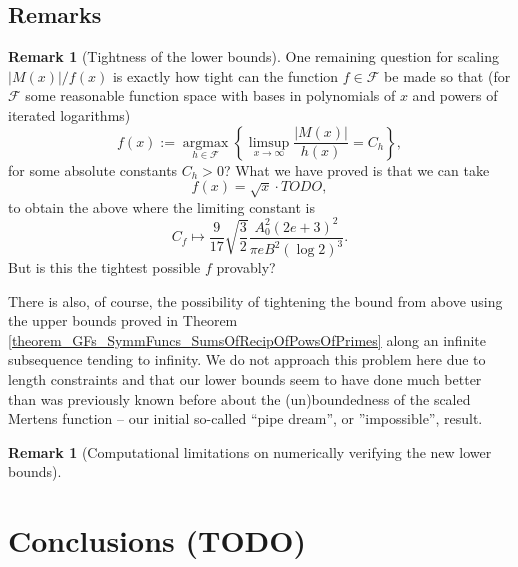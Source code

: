 \documentclass[11pt,reqno,a4letter]{article}
\numberwithin{figure}{section}
\numberwithin{table}{section}
\theoremstyle{plain}
\numberwithin{theorem}{section}
\theoremstyle{definition}
\newtheorem{remark}[theorem]{Remark}
\begin{document}
\subsection{Remarks} 

\begin{remark}[Tightness of the lower bounds] 
One remaining question for scaling $|M(x)| / f(x)$ is exactly how tight can the function 
$f \in \mathcal{F}$ be made so that 
(for $\mathcal{F}$ some reasonable function space with bases in polynomials of $x$ and 
powers of iterated logarithms) 
\[
f(x) := 
     \operatorname{argmax}\limits_{h \in \mathcal{F}} 
     \left\{\limsup_{x \rightarrow \infty} \frac{|M(x)|}{h(x)} = C_h \right\},  
\] 
for some absolute constants $C_h > 0$? 
What we have proved is that we can take 
\[
f(x) =  \sqrt{x} \cdot TODO, 
\]
to obtain the above where the limiting constant is 
$$C_f \mapsto \frac{9}{17} \sqrt{\frac{3}{2}} \frac{A_0^2 (2e+3)^2}{\pi e B^2 (\log 2)^3}.$$ 
But is this the tightest possible $f$ provably? 

There is also, of course, 
the possibility of tightening the bound from above using the upper bounds proved in 
Theorem \ref{theorem_GFs_SymmFuncs_SumsOfRecipOfPowsOfPrimes} 
along an infinite subsequence tending to infinity. 
We do not approach this problem here 
due to length constraints and that our lower bounds seem to have done much better than was 
previously known before about the (un)boundedness of the scaled Mertens function -- our initial 
so-called ``pipe dream'', or ''impossible'', result.  
\end{remark} 

\begin{remark}[Computational limitations on numerically verifying the new lower bounds]
\end{remark} 

\newpage 
\section{Conclusions (TODO)} 

\newpage 
\renewcommand{\refname}{References} 
{}

\end{document}
